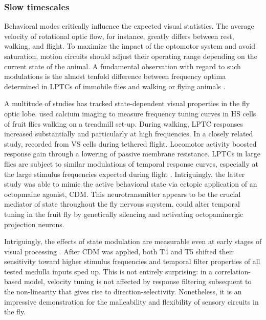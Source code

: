 \subsubsection{Slow timescales}
Behavioral modes critically influence the expected visual statistics. The average velocity of rotational optic flow, for instance, greatly differs between rest, walking, and flight. To maximize the impact of the optomotor system and avoid saturation, motion circuits should adjust their operating range depending on the current state of the animal. A fundamental observation with regard to such modulations is the almost tenfold difference between frequency optima determined in LPTCs of immobile flies and walking or flying animals \citep{Joesch:2008fo,Duistermars:2007aa}.

A multitude of studies has tracked state-dependent visual properties in the fly optic lobe. \citet{Chiappe:2010cl} used calcium imaging to measure frequency tuning curves in HS cells of fruit flies walking on a treadmill set-up. During walking, LPTC responses increased substantially and particularly at high frequencies. In a closely related study, \citet{Maimon:2010jy} recorded from VS cells during tethered flight. Locomotor activity boosted response gain through a lowering of passive membrane resistance. LPTCs in large flies are subject to similar modulations of temporal response curves, especially at the large stimulus frequencies expected during flight \citep{Jung:2011bc}. Intriguingly, the latter study was able to mimic the active behavioral state via ectopic application of an octopmaine agonist, CDM. This neurotransmitter appears to be the crucial mediator of state throughout the fly nervous suystem. \citet{Suver:2012bya} could alter temporal tuning in the fruit fly by genetically silencing and activating octopaminergic projection neurons.

Intriguingly, the effects of state modulation are measurable even at early stages of visual processing \citep{Arenz:2017aa}. After CDM was applied, both T4 and T5 shifted their sensitivity toward higher stimulus frequencies and temporal filter properties of all tested medulla inputs sped up. This is not entirely surprising: in a correlation-based model, velocity tuning is not affected by response filtering subsequent to the non-linearity that gives rise to direction-selectivity. Nonetheless, it is an impressive demonstration for the malleability and flexibility of sensory circuits in the fly.

